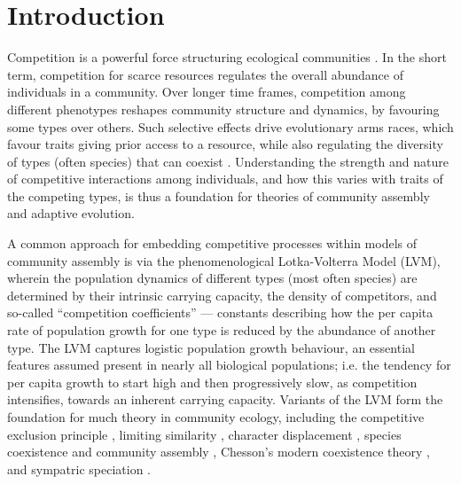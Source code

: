 \documentclass[a4paper,11pt]{article}
\begin{document}
\section{Introduction}

Competition is a powerful force structuring ecological communities \citep{Schluter-2000,Vellend-2016}. In the short term, competition for scarce resources regulates the overall abundance of individuals in a community. Over longer time frames, competition among different phenotypes reshapes community structure and dynamics, by favouring some types over others. Such selective effects drive evolutionary arms races, which favour traits giving prior access to a resource, while also regulating the diversity of types (often species) that can coexist \citep[e.g.][]{Gause-1934,Lack-1947,MacArthur-1967}. Understanding the strength and nature of competitive interactions among individuals, and how this varies with traits of the competing types, is thus a foundation for theories of community assembly and adaptive evolution.

A common approach for embedding competitive processes within models of community assembly is via the phenomenological Lotka-Volterra Model (LVM), wherein the  population dynamics of different types (most often species) are determined by their intrinsic carrying capacity, the density of competitors, and so-called ``competition coefficients'' \citep{Lotka-1925, Volterra-1926} --- constants describing how the per capita rate of population growth for one type is reduced by the abundance of another type. The LVM captures logistic population growth behaviour, an essential features assumed present in nearly all biological populations; i.e. the tendency for per capita growth to start high and then progressively slow, as competition intensifies, towards an inherent carrying capacity. Variants of the LVM form the foundation for much theory in community ecology, including the competitive exclusion principle \citep{Gause-1934}, limiting similarity \citep{MacArthur-1967, May-1972, Slatkin-1980, Abrams-1983}, character displacement \citep{Taper-1985, Case-2000}, species coexistence and community assembly \citep{MacArthur-1967, Calcagno-2006, Leimar-2013, DAndrea-2019}, Chesson's modern coexistence theory \citep{Chesson-2000,Barabas-2018}, and sympatric speciation \citep{Dieckmann-1999}.
\end{document}
